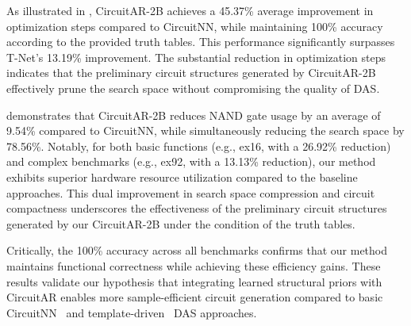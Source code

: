 As illustrated in , CircuitAR-2B achieves a 45.37\% average improvement in optimization steps compared to CircuitNN, while maintaining 100\% accuracy according to the provided truth tables. 
This performance significantly surpasses T-Net's 13.19\% improvement. 
The substantial reduction in optimization steps indicates that the preliminary circuit structures generated by CircuitAR-2B effectively prune the search space without compromising the quality of DAS. 

 demonstrates that CircuitAR-2B reduces NAND gate usage by an average of 9.54\% compared to CircuitNN, while simultaneously reducing the search space by 78.56\%. 
Notably, for both basic functions (e.g., ex16, with a 26.92\% reduction) and complex benchmarks (e.g., ex92, with a 13.13\% reduction), our method exhibits superior hardware resource utilization compared to the baseline approaches. 
This dual improvement in search space compression and circuit compactness underscores the effectiveness of the preliminary circuit structures generated by our CircuitAR-2B under the condition of the truth tables.

Critically, the 100\% accuracy across all benchmarks confirms that our method maintains functional correctness while achieving these efficiency gains. 
These results validate our hypothesis that integrating learned structural priors with CircuitAR enables more sample-efficient circuit generation compared to basic CircuitNN~\cite{deepmind2024ai4sys} and template-driven~\cite{wang2024tnet} DAS approaches.    

